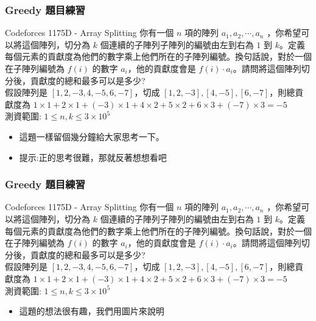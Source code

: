 \documentclass[aspectratio=169]{beamer}
\begin{document}
\begin{frame}
\frametitle{Greedy 題目練習}
    \begin{block}{Codeforces 1175D - Array Splitting}
        你有一個 $n$ 項的陣列 $a_1, a_2, \cdots,a_n$ ，你希望可以將這個陣列，切分為 $k$ 個連續的子陣列子陣列的編號由左到右為 $1$ 到 $k$。定義每個元素的貢獻度為他們的數字乘上他們所在的子陣列編號。換句話說，對於一個在子陣列編號為 $f(i)$ 的數字 $a_i$，他的貢獻度會是 $f(i) \cdot a_i$。請問將這個陣列切分後，貢獻度的總和最多可以是多少? \\
        \vspace{5mm}
        假設陣列是 $[1,2,-3,4,-5,6,-7]$，切成 $[1,2,-3],[4,-5],[6,-7]$，則總貢獻度為 $1 \times 1 + 2 \times 1 + (-3) \times 1 + 4 \times 2 + 5 \times 2 + 6 \times 3 + (-7) \times 3 = -5$ \\
        \vspace{5mm}
        測資範圍: $1 \le n,k \le 3 \times 10^5$
    \end{block}
    \begin{itemize}
        \item<1-> 這題一樣留個幾分鐘給大家思考一下。
        \item<2-> 提示:正的思考很難，那就反著想想看吧
    \end{itemize}
\end{frame}

\begin{frame}
\frametitle{Greedy 題目練習}
    \begin{block}{Codeforces 1175D - Array Splitting}
        你有一個 $n$ 項的陣列 $a_1, a_2, \cdots,a_n$ ，你希望可以將這個陣列，切分為 $k$ 個連續的子陣列子陣列的編號由左到右為 $1$ 到 $k$。定義每個元素的貢獻度為他們的數字乘上他們所在的子陣列編號。換句話說，對於一個在子陣列編號為 $f(i)$ 的數字 $a_i$，他的貢獻度會是 $f(i) \cdot a_i$。請問將這個陣列切分後，貢獻度的總和最多可以是多少? \\
        \vspace{5mm}
        假設陣列是 $[1,2,-3,4,-5,6,-7]$，切成 $[1,2,-3],[4,-5],[6,-7]$，則總貢獻度為 $1 \times 1 + 2 \times 1 + (-3) \times 1 + 4 \times 2 + 5 \times 2 + 6 \times 3 + (-7) \times 3 = -5$ \\
        \vspace{5mm}
        測資範圍: $1 \le n,k \le 3 \times 10^5$
    \end{block}
    \begin{itemize}
        \item<1-> 這題的想法很有趣，我們用圖片來說明
    \end{itemize}
\end{frame}
\end{document}
